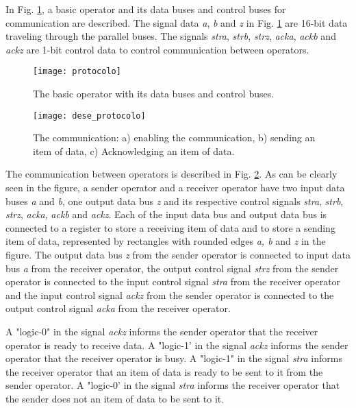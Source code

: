\documentclass[preprint,12pt]{elsarticle}
\begin{document}
In Fig. \ref{f2}, a basic operator and its data buses and control buses for communication are described. The signal data  {\it a}, {\it b} and {\it z} in Fig. \ref{f2} are 16-bit data traveling through the parallel buses. The signals {\it stra}, {\it strb}, {\it strz}, {\it acka}, {\it ackb} and {\it ackz} are 1-bit control data to control communication between operators.



\begin{figure}[h]
\begin{center}
   \texttt{[image: protocolo]}
   \caption{The basic operator with its data buses and control buses.} \label{f2}
\end{center}
\end{figure}




\begin{figure}[h]
\begin{center}
   \texttt{[image: dese\_protocolo]}
   \caption{The communication: a) enabling the communication, b) sending an item of data, c) Acknowledging an item of data.} \label{f3}
\end{center}
\end{figure}


The communication between operators is described in Fig. \ref{f3}. As can be clearly seen in the figure, a sender operator and a receiver operator have two input data buses {\it a} and {\it b}, one output data bus {\it z} and its respective control signals  {\it stra}, {\it strb}, {\it strz}, {\it acka}, {\it ackb} and {\it ackz}. Each of the input data bus and output data bus is connected to a register to store a receiving item of data and to store a sending item of data, represented by rectangles with rounded edges {\it a, b} and {\it z} in the figure. The output data bus {\it z} from the sender operator is connected to input data bus {\it a} from the receiver operator, the output control signal {\it strz}  from the sender operator is connected to the input control signal {\it stra} from the receiver operator and the input control signal {\it ackz} from the sender operator is connected to the output control signal {\it acka} from the receiver operator.

A "logic-0" in the signal {\it ackz} informs the sender operator that the receiver operator is ready to receive data. A "logic-1' in the signal {\it ackz} informs the sender operator that the receiver operator is busy. A "logic-1" in the signal {\it stra} informs the receiver operator that an item of data is ready to be sent to it from the sender operator. A "logic-0' in the signal {\it stra} informs the receiver operator that the sender does not an item of data to be sent to it.
\end{document}
